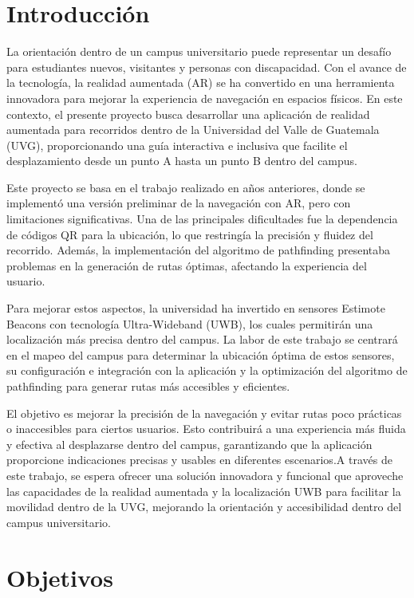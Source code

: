 \documentclass{article}
\begin{document}
\section{Introducción}
{\justify
La orientación dentro de un campus universitario puede representar un desafío para estudiantes nuevos, visitantes y personas con
 discapacidad. Con el avance de la tecnología, la realidad aumentada (AR) se ha convertido en una herramienta innovadora para mejorar
  la experiencia de navegación en espacios físicos. En este contexto, el presente proyecto busca desarrollar una aplicación de realidad
   aumentada para recorridos dentro de la Universidad del Valle de Guatemala (UVG), proporcionando una guía interactiva e inclusiva 
   que facilite el desplazamiento desde un punto A hasta un punto B dentro del campus.

Este proyecto se basa en el trabajo realizado en años anteriores, donde se implementó una versión preliminar de la navegación con AR,
 pero con limitaciones significativas. Una de las principales dificultades fue la dependencia de códigos QR para la ubicación, lo que
  restringía la precisión y fluidez del recorrido. Además, la implementación del algoritmo de pathfinding presentaba problemas en la 
  generación de rutas óptimas, afectando la experiencia del usuario.

Para mejorar estos aspectos, la universidad ha invertido en sensores Estimote Beacons con tecnología Ultra-Wideband (UWB), los cuales
 permitirán una localización más precisa dentro del campus. La labor de este trabajo se centrará en el mapeo del campus para 
 determinar la ubicación óptima de estos sensores, su configuración e integración con la aplicación y la optimización del algoritmo
  de pathfinding para generar rutas más accesibles y eficientes.

El objetivo es mejorar la precisión de la navegación y evitar rutas poco prácticas o inaccesibles para ciertos usuarios. Esto 
contribuirá a una experiencia más fluida y efectiva al desplazarse dentro del campus, garantizando que la aplicación proporcione 
indicaciones precisas y usables en diferentes escenarios.A través de este trabajo, se espera ofrecer una solución innovadora y 
funcional que aproveche las capacidades de la realidad aumentada y la localización UWB para facilitar la movilidad dentro de la UVG,
 mejorando la orientación y accesibilidad dentro del campus universitario.}
\newpage

\section{Objetivos}
\end{document}

